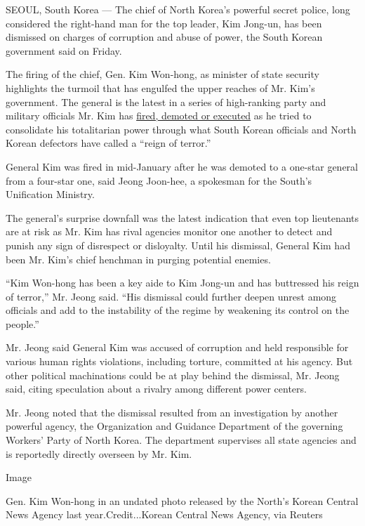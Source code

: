 SEOUL, South Korea --- The chief of North Korea's powerful secret
police, long considered the right-hand man for the top leader, Kim
Jong-un, has been dismissed on charges of corruption and abuse of power,
the South Korean government said on Friday.

The firing of the chief, Gen. Kim Won-hong, as minister of state
security highlights the turmoil that has engulfed the upper reaches of
Mr. Kim's government. The general is the latest in a series of
high-ranking party and military officials Mr. Kim has
\href{https://www.nytimes.com/2016/09/01/world/asia/north-korea-executes-deputy-premier.html?_r=0}{fired,
demoted or executed} as he tried to consolidate his totalitarian power
through what South Korean officials and North Korean defectors have
called a ``reign of terror.''

General Kim was fired in mid-January after he was demoted to a one-star
general from a four-star one, said Jeong Joon-hee, a spokesman for the
South's Unification Ministry.

The general's surprise downfall was the latest indication that even top
lieutenants are at risk as Mr. Kim has rival agencies monitor one
another to detect and punish any sign of disrespect or disloyalty. Until
his dismissal, General Kim had been Mr. Kim's chief henchman in purging
potential enemies.

``Kim Won-hong has been a key aide to Kim Jong-un and has buttressed his
reign of terror,'' Mr. Jeong said. ``His dismissal could further deepen
unrest among officials and add to the instability of the regime by
weakening its control on the people.''

Mr. Jeong said General Kim was accused of corruption and held
responsible for various human rights violations, including torture,
committed at his agency. But other political machinations could be at
play behind the dismissal, Mr. Jeong said, citing speculation about a
rivalry among different power centers.

Mr. Jeong noted that the dismissal resulted from an investigation by
another powerful agency, the Organization and Guidance Department of the
governing Workers' Party of North Korea. The department supervises all
state agencies and is reportedly directly overseen by Mr. Kim.

Image

Gen. Kim Won-hong in an undated photo released by the North's Korean
Central News Agency last year.Credit...Korean Central News Agency, via
Reuters

